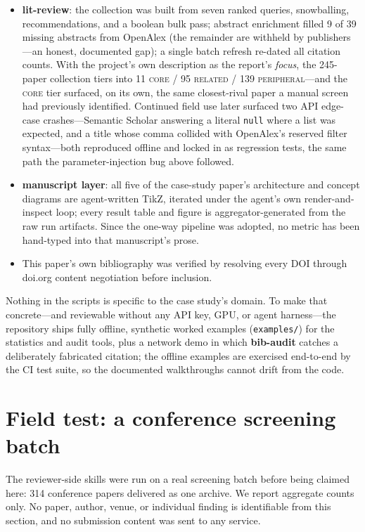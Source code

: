\documentclass[11pt]{article}
\begin{document}
\begin{itemize}
as a regression test. We publish no capability we have not exercised---the
same standard the toolkit enforces on its users' claims.
\item \textbf{lit-review}: the collection was built from seven ranked queries,
snowballing, recommendations, and a boolean bulk pass; abstract enrichment
filled 9 of 39 missing abstracts from OpenAlex (the remainder are withheld by
publishers---an honest, documented gap); a single batch refresh re-dated all
citation counts. With the project's own description as the report's
\emph{focus}, the 245-paper collection tiers into 11 \textsc{core} / 95
\textsc{related} / 139 \textsc{peripheral}---and the \textsc{core} tier
surfaced, on its own, the same closest-rival paper a manual screen had
previously identified. Continued field use later surfaced two API edge-case
crashes---Semantic Scholar answering a literal \texttt{null} where a list was
expected, and a title whose comma collided with OpenAlex's reserved filter
syntax---both reproduced offline and locked in as regression tests, the same
path the parameter-injection bug above followed.
\item \textbf{manuscript layer}: all five of the case-study paper's
architecture and concept diagrams are agent-written TikZ, iterated under the
agent's own render-and-inspect loop; every result table and figure is
aggregator-generated from the raw run artifacts. Since the one-way pipeline
was adopted, no metric has been hand-typed into that manuscript's prose.
\item This paper's own bibliography was verified by resolving every DOI
through doi.org content negotiation before inclusion.
\end{itemize}

Nothing in the scripts is specific to the case study's domain. To make that
concrete---and reviewable without any API key, GPU, or agent
harness---the repository ships fully offline, synthetic worked examples
(\texttt{examples/}) for the statistics and audit tools, plus a network demo
in which \textbf{bib-audit} catches a deliberately fabricated citation; the
offline examples are exercised end-to-end by the CI test suite, so the
documented walkthroughs cannot drift from the code.

\section{Field test: a conference screening batch}
\label{sec:field}

The reviewer-side skills were run on a real screening batch before being
claimed here: 314 conference papers delivered as one archive. We report
aggregate counts only. No paper, author, venue, or individual finding is
identifiable from this section, and no submission content was sent to any
service.
\end{document}
